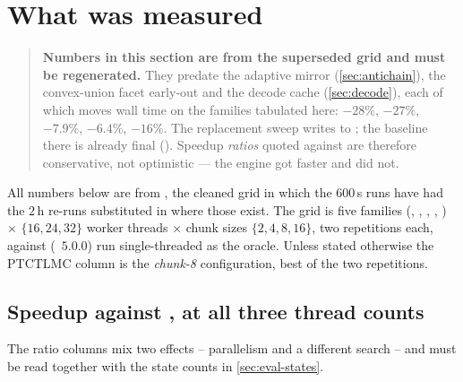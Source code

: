 %
\section{What was measured}
\label{sec:eval}

\begin{quote}\small\textbf{Numbers in this section are from the superseded
grid and must be regenerated.}  They predate the adaptive mirror
(\cref{sec:antichain}), the convex-union facet early-out and the decode cache
(\cref{sec:decode}), each of which moves wall time on the families tabulated
here:  $-28\%$,  $-27\%$,  $-7.9\%$,
 $-6.4\%$,  $-16\%$.  The replacement sweep writes
to ; the \uppaal{} baseline there is already
final ().  Speedup \emph{ratios} quoted against \uppaal{} are
therefore conservative, not optimistic --- the engine got faster and
 did not.\end{quote}


All numbers below are from , the cleaned grid
in which the $600$\,s runs have had the $2$\,h re-runs substituted in where
those exist.  The grid is five families (, ,
, , ) $\times$ $\{16,24,32\}$ worker
threads $\times$ chunk sizes $\{2,4,8,16\}$, two repetitions each, against
 (\uppaal{}~$5.0.0$) run single-threaded as the oracle.  Unless
stated otherwise the PTCTLMC column is the \emph{chunk-8} configuration, best
of the two repetitions.

\subsection{Speedup against , at all three thread counts}

The ratio columns mix two effects -- parallelism and a different search -- and
must be read together with the state counts in \cref{sec:eval-states}.

